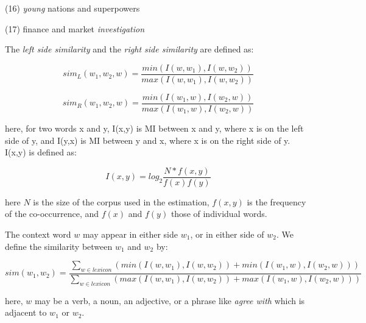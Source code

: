 \vspace*{4mm}

\hspace*{5mm}(16) {\it young} nations and superpowers

\hspace*{5mm}(17) finance and market {\it investigation}

\vspace*{4mm}

The {\it left side similarity} and the {\it right side similarity} are defined as:

\vspace*{2mm}
\begin{equation}
  sim_L(w_1,w_2,w) =
\frac{min(I(w,w_1),I(w,w_2))}{max(I(w,w_1),I(w,w_2))} 
\end{equation} 


\begin{equation}
  sim_R(w_1,w_2,w) =
\frac{min(I(w_1,w),I(w_2,w))}{max(I(w_1,w),I(w_2,w))} 
\end{equation} 


\vspace*{4mm}
\hspace*{-5mm}here, for two words x and y, I(x,y) is MI between x and y,
where x is on the left side of y, and I(y,x) is MI between y and x, where x is on the
right side of y.  I(x,y) is defined as:

\vspace*{2mm}
\begin{equation}  
I(x,y) = log_2 \frac{N*f(x,y)}{f(x)f(y)}
\end{equation}

\vspace*{4mm}
\hspace*{-5mm}here $N$  is the size of the corpus used in the estimation,
$f(x,y)$ is the frequency of the co-occurrence, and
$f(x)$ and $f(y)$ those of individual words.


The context word $w$ may appear in either side $w_1$, or in either side of $w_2$. We 
define the similarity between $w_1$ and $w_2$ by:


\vspace*{2mm}

\begin{equation}
  sim(w_1,w_2) = \frac{\sum_{w \in lexicon}(min(I(w,w_1),I(w,w_2))+
min(I(w_1,w),I(w_2,w)))}{\sum_{w \in lexicon}(max(I(w,w_1),I(w,w_2))+
max(I(w_1,w),I(w_2,w)))}
\end{equation} 

\vspace*{4mm}
\hspace*{-5mm}here, $w$ may be a verb, a noun, an
adjective, or a phrase like {\it agree with} which is adjacent to $w_1$ or $w_2$.

